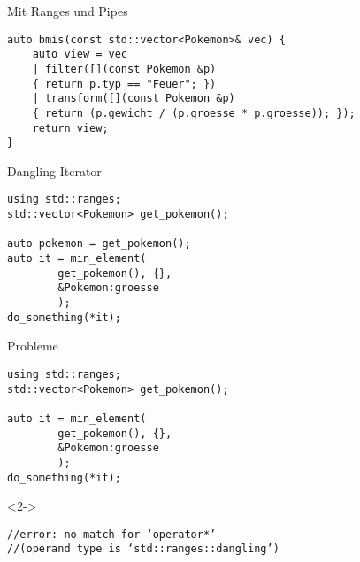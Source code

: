 \begin{frame}[fragile]{Mit Ranges und Pipes}
    \begin{verbatim}
auto bmis(const std::vector<Pokemon>& vec) {
    auto view = vec
    | filter([](const Pokemon &p)
    { return p.typ == "Feuer"; })
    | transform([](const Pokemon &p)
    { return (p.gewicht / (p.groesse * p.groesse)); });
    return view;
}
\end{verbatim}
\end{frame}

\begin{frame}[fragile]{Dangling Iterator}
    \begin{overlayarea}{\linewidth}{3cm}
    \begin{verbatim}
using std::ranges;
std::vector<Pokemon> get_pokemon();

auto pokemon = get_pokemon();
auto it = min_element(
        get_pokemon(), {},
        &Pokemon:groesse
        );
do_something(*it);
    \end{verbatim}
\end{overlayarea}
\end{frame}

\begin{frame}[fragile]{Probleme}
    \begin{overlayarea}{\linewidth}{3cm}
    \begin{verbatim}
using std::ranges;
std::vector<Pokemon> get_pokemon();

auto it = min_element(
        get_pokemon(), {},
        &Pokemon:groesse
        );
do_something(*it);
    \end{verbatim}
    \begin{onlyenv}<2->
        \begin{verbatim}
//error: no match for ‘operator*’
//(operand type is ‘std::ranges::dangling’)
        \end{verbatim}
    \end{onlyenv}
\end{overlayarea}
\end{frame}



